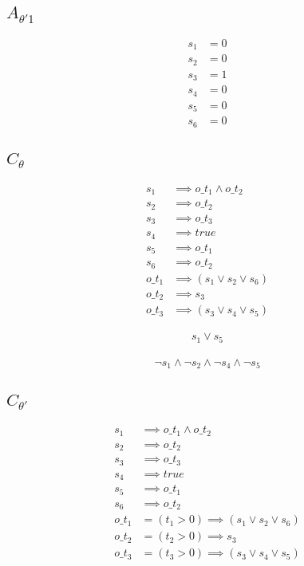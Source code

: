 \documentclass{scrartcl}
\begin{document}
\subsection{$A_{\theta'1}$}
\begin{align*}
  s_1 &= 0 \\
  s_2 &= 0 \\
  s_3 &= 1 \\
  s_4 &= 0 \\
  s_5 &= 0 \\
  s_6 &= 0
\end{align*}

\subsection{$C_\theta$}

\begin{align*}
  s_1 &\implies o\_t_1 \land o\_t_2 \\
  s_2 &\implies o\_t_2 \\
  s_3 &\implies o\_t_3 \\
  s_4 &\implies true \\
  s_5 &\implies o\_t_1 \\
  s_6 &\implies o\_t_2 \\
  o\_t_1 &\implies (s_1 \lor s_2 \lor s_6) \\
  o\_t_2 &\implies s_3 \\
  o\_t_3 &\implies (s_3 \lor s_4 \lor s_5)
\end{align*}

\begin{align*}
  s_1 \lor s_5
\end{align*}

\begin{align*}
  \neg s_1 \land \neg s_2 \land \neg s_4 \land \neg s_5
\end{align*}

\subsection{$C_{\theta'}$}

\begin{align*}
  s_1 &\implies o\_t_1 \land o\_t_2 \\
  s_2 &\implies o\_t_2 \\
  s_3 &\implies o\_t_3 \\
  s_4 &\implies true \\
  s_5 &\implies o\_t_1 \\
  s_6 &\implies o\_t_2 \\
  o\_t_1 &= (t_1 > 0) \implies (s_1 \lor s_2 \lor s_6) \\
  o\_t_2 &= (t_2 > 0) \implies s_3 \\
  o\_t_3 &= (t_3 > 0) \implies (s_3 \lor s_4 \lor s_5)
\end{align*}
\end{document}
